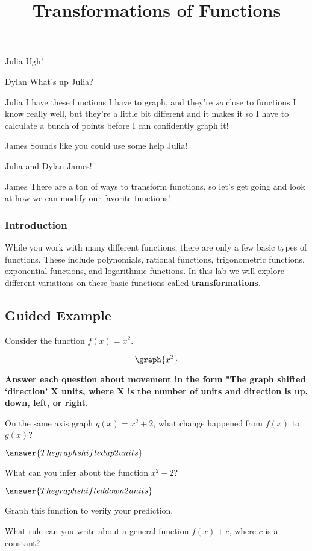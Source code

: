 \documentclass{ximera}
\title{Transformations of Functions}
\begin{document}
\maketitle
\begin{dialogue}
\item[Julia] Ugh!
\item[Dylan] What's up Julia?
\item[Julia] I have these functions I have to graph, and they're \textit{so} close to functions I know really well, but they're a little bit different and it makes it so I have to calculate a bunch of points before I can confidently graph it!
\item[James] Sounds like you could use some help Julia!
\item[Julia and Dylan] James!
\item[James] There are a ton of ways to transform functions, so let's get going and look at how we can modify our favorite functions!
\end{dialogue}
\subsubsection{Introduction}
While you work with many different functions, there are only a few basic types of functions. These include polynomials, rational functions, trigonometric functions, exponential functions, and logarithmic functions. In this lab we will explore different variations on these basic functions called \textbf{transformations}.
\subsection{Guided Example}
Consider the function $f(x)=x^2$.

\[
\graph{x^2}
\]

\textbf{Answer each question about movement in the form "The graph shifted `direction' X units, where X is the number of units and direction is up, down, left, or right.}

On the same axis graph $g(x)=x^2+2$, what change happened from $f(x)$ to $g(x)$?

$\answer{The graph shifted up 2 units}$

What can you infer about the function $x^2-2$?

$\answer{The graph shifted down 2 units}$

Graph this function to verify your prediction.

What rule can you write about a general function $f(x)+c$, where $c$ is a constant?
\end{document}

